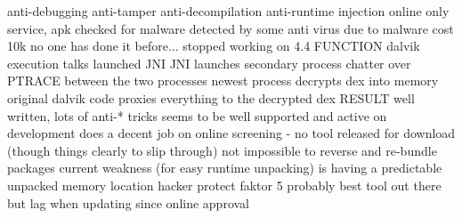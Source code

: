 anti-debugging\newline
anti-tamper\newline
anti-decompilation\newline
anti-runtime injection\newline
online only service, apk checked for malware\newline
detected by some anti virus due to malware\newline
cost 10k\newline
no one has done it before...\newline
stopped working on 4.4\newline
FUNCTION\newline
dalvik execution talks launched JNI\newline
JNI launches secondary process\newline
chatter over PTRACE between the two processes\newline
newest process decrypts dex into memory\newline
original dalvik code proxies everything to the decrypted dex\newline
RESULT\newline
well written, lots of anti-* tricks\newline
seems to be well supported and active on development\newline
does a decent job on online screening - no tool released for download (though things clearly to slip through)\newline
not impossible to reverse and re-bundle packages\newline
current weakness (for easy runtime unpacking) is having a predictable unpacked memory location\newline
hacker protect faktor 5\newline
probably best tool out there but lag when updating since online approval\newline
